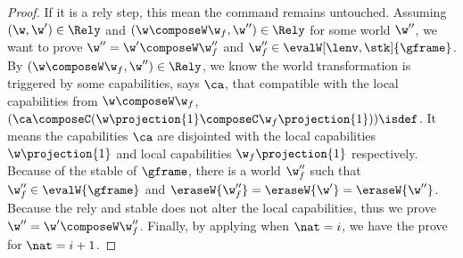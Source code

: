 \begin{proof}
If it is a rely step, this mean the command remains untouched.
Assuming \( (\w, \w') \in \Rely \) and \( (\w \composeW \w_f, \w'') \in \Rely \) for some world \( \w'' \), we want to prove \( \w''  = \w' \composeW \w_f'' \) and \( \w_f'' \in \evalW[\lenv, \stk]{\gframe} \).
By \( (\w \composeW \w_f, \w'') \in \Rely \), we know the world transformation is triggered by some capabilities, says \( \ca\), that compatible with the local capabilities from \( \w \composeW \w_f \), \ie \( (\ca \composeC (\w\projection{1} \composeC \w_f\projection{1}) )\isdef \).
It means the capabilities \( \ca \) are disjointed with the local capabilities \( \w\projection{1} \) and local capabilities \( \w_f\projection{1}\) respectively.
Because of the stable of \( \gframe \), there is a world \( \w_f'' \) such that \( \w_f'' \in \evalW{\gframe}\) and \( \eraseW{\w_f''} = \eraseW{\w'} = \eraseW{\w''}\).
Because the rely and stable does not alter the local capabilities, thus we prove \( \w'' = \w' \composeW \w_f'' \).
Finally, by applying \ih when \( \nat = i \), we have the prove for \( \nat = i + 1 \).


\end{proof}


